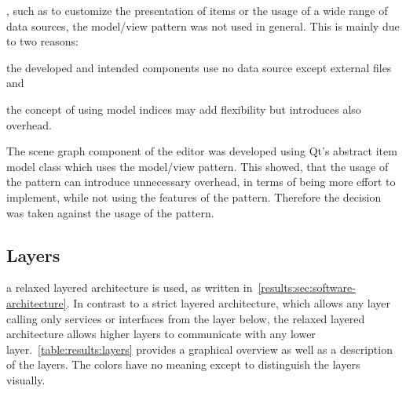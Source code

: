 \documentclass[%
    a4paper,    %
    justified,  %
    nobib,      %
    openany     %
]{tufte-book}
\begin{document}
, such as to customize the presentation
of items or the usage of a wide range of data sources, the model/view pattern was
not used in general. This is mainly due to two reasons:
\begin{enumerate*}
  \item the developed and intended components use no data source except external
    files and
  \item the concept of using model indices may add flexibility but introduces
    also overhead.
\end{enumerate*} The scene graph component of the editor was developed using
Qt's abstract item model class which uses the model/view pattern. This showed,
that the usage of the pattern can introduce unnecessary overhead, in terms of
being more effort to implement, while not using the features of the pattern.
Therefore the decision was taken against the usage of the pattern.

\subsection{Layers}
\label{results:subsec:layers}

 a relaxed layered architecture
is used, as written in~\cref{results:sec:software-architecture}. In contrast to a strict
layered architecture, which allows any layer calling only services or interfaces
from the layer below, the relaxed layered architecture allows higher layers to
communicate with any lower layer.~\cref{table:results:layers} provides a
graphical overview as well as a description of the layers. The colors have no
meaning except to distinguish the layers visually.
\end{document}
